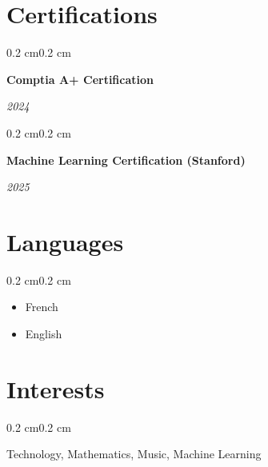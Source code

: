 \documentclass[10pt, letterpaper]{article}
\newenvironment{highlights}{%
    \begin{itemize}[
        topsep=0.10 cm,%
        parsep=0.10 cm,%
        partopsep=0pt,%
        itemsep=0pt,%
        leftmargin=0.4 cm + 10pt%
    ]
}{%
    \end{itemize}%
}
\newenvironment{onecolentry}{%
    \begin{adjustwidth}{0.2 cm}{0.2 cm}%
}{%
    \end{adjustwidth}%
}
\newenvironment{twocolentry}[1]{%
    \begin{onecolentry}%
    \def\twocolentryarg{#1}%
    \noindent
    \begin{minipage}[t]{0.68\textwidth} %
}{%
    \end{minipage}\hfill%
    \begin{minipage}[t]{0.30\textwidth} %
      \raggedleft\twocolentryarg
    \end{minipage}%
    \vspace{0.2cm}%
    \end{onecolentry}%
}
\begin{document}
\section{Certifications}
\begin{twocolentry}{\textit{2024}}
    \textbf{Comptia A+ Certification }\\
    \textit{ }
\end{twocolentry}
\vspace{0.10 cm}
\begin{twocolentry}{\textit{2025}}
    \textbf{Machine Learning Certification (Stanford) }\\
    \textit{ }
\end{twocolentry}
\vspace{0.10 cm}

\section{Languages}
\begin{onecolentry}
    \begin{highlights}
        \item French  
        \item English  
    \end{highlights}
\end{onecolentry}

\section{Interests}
\begin{onecolentry}
    Technology, Mathematics, Music, Machine Learning
\end{onecolentry}
\end{document}
